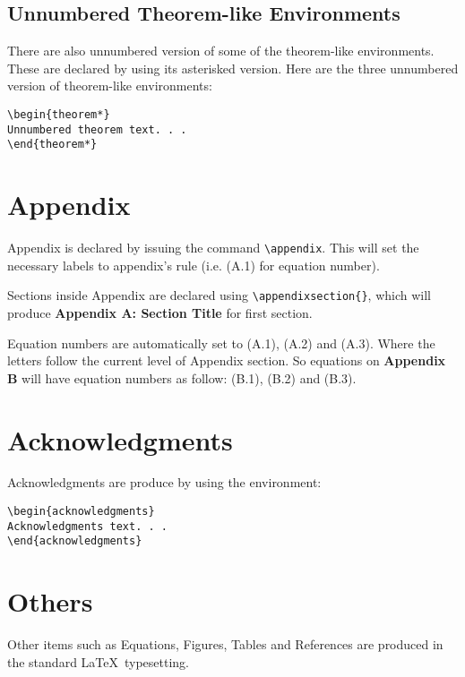 \documentclass{clv3}
\begin{document}
\subsection{Unnumbered Theorem-like Environments}

There are also unnumbered version of some of the theorem-like environments.
These are declared by using its asterisked version. Here are the three
unnumbered version of theorem-like environments:

\begin{verbatim}
\begin{theorem*}
Unnumbered theorem text. . .
\end{theorem*}
\end{verbatim}

\section{Appendix}

Appendix is declared by issuing the command \verb|\appendix|. This will set
the necessary labels to appendix's rule (i.e. (A.1) for equation number).

Sections inside Appendix are declared using \verb|\appendixsection{}|, which
will produce {\bf Appendix A: Section Title} for first section.

Equation numbers are automatically set to (A.1), (A.2) and (A.3). Where the letters
follow the current level of Appendix section. So equations on {\bf Appendix B}
will have equation numbers as follow: (B.1), (B.2) and (B.3).

\section{Acknowledgments}

Acknowledgments are produce by using the environment:
\\
\begin{verbatim}
\begin{acknowledgments}
Acknowledgments text. . .
\end{acknowledgments}
\end{verbatim}

\section{Others}

Other items such as Equations, Figures, Tables and References are produced in
the standard \LaTeX\ typesetting.

\starttwocolumn

\end{document}
